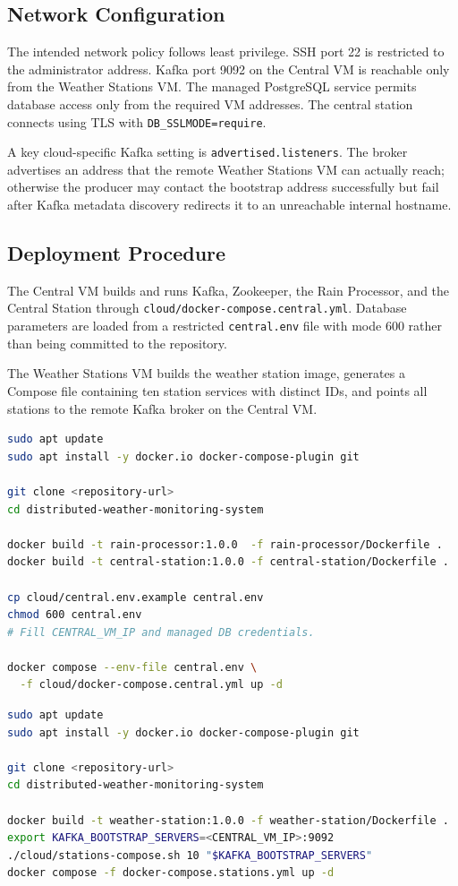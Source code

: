 \documentclass[12pt,a4paper]{article}
\begin{document}
\subsection{Network Configuration}
The intended network policy follows least privilege. SSH port 22 is restricted to the administrator address. Kafka port 9092 on the Central VM is reachable only from the Weather Stations VM. The managed PostgreSQL service permits database access only from the required VM addresses. The central station connects using TLS with \texttt{DB\_SSLMODE=require}.

A key cloud-specific Kafka setting is \texttt{advertised.listeners}. The broker advertises an address that the remote Weather Stations VM can actually reach; otherwise the producer may contact the bootstrap address successfully but fail after Kafka metadata discovery redirects it to an unreachable internal hostname.

\subsection{Deployment Procedure}
The Central VM builds and runs Kafka, Zookeeper, the Rain Processor, and the Central Station through \texttt{cloud/docker-compose.central.yml}. Database parameters are loaded from a restricted \texttt{central.env} file with mode 600 rather than being committed to the repository.

The Weather Stations VM builds the weather station image, generates a Compose file containing ten station services with distinct IDs, and points all stations to the remote Kafka broker on the Central VM.

\begin{lstlisting}[language=bash,caption={Representative Central VM deployment commands.}]
sudo apt update
sudo apt install -y docker.io docker-compose-plugin git

git clone <repository-url>
cd distributed-weather-monitoring-system

docker build -t rain-processor:1.0.0  -f rain-processor/Dockerfile .
docker build -t central-station:1.0.0 -f central-station/Dockerfile .

cp cloud/central.env.example central.env
chmod 600 central.env
# Fill CENTRAL_VM_IP and managed DB credentials.

docker compose --env-file central.env \
  -f cloud/docker-compose.central.yml up -d
\end{lstlisting}

\begin{lstlisting}[language=bash,caption={Representative Weather Stations VM deployment commands.}]
sudo apt update
sudo apt install -y docker.io docker-compose-plugin git

git clone <repository-url>
cd distributed-weather-monitoring-system

docker build -t weather-station:1.0.0 -f weather-station/Dockerfile .
export KAFKA_BOOTSTRAP_SERVERS=<CENTRAL_VM_IP>:9092
./cloud/stations-compose.sh 10 "$KAFKA_BOOTSTRAP_SERVERS"
docker compose -f docker-compose.stations.yml up -d
\end{lstlisting}
\end{document}
